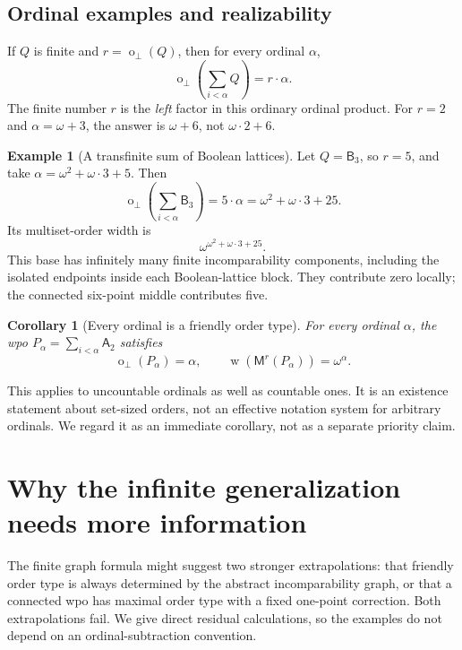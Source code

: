\documentclass[11pt,a4paper]{article}
\newtheorem{corollary}[theorem]{Corollary}
\theoremstyle{definition}
\newtheorem{example}[theorem]{Example}
\theoremstyle{remark}
\newcommand{\fot}{\operatorname{o}_{\perp}}
\newcommand{\wid}{\operatorname{w}}
\newcommand{\Mr}{\mathsf{M}^{r}}
\newcommand{\Ant}{\mathsf{A}}
\newcommand{\bool}{\mathsf{B}}
\begin{document}
\subsection{Ordinal examples and realizability}

If $Q$ is finite and $r=\fot(Q)$, then for every ordinal $\alpha$,
\begin{equation}\label{eq:repeat}
 \fot\!\left(\sum_{i<\alpha}Q\right)=r\cdot\alpha.
\end{equation}
The finite number $r$ is the \emph{left} factor in this ordinary ordinal
product. For $r=2$ and $\alpha=\omega+3$, the answer is $\omega+6$, not
$\omega\cdot2+6$.

\begin{example}[A transfinite sum of Boolean lattices]
Let $Q=\bool_3$, so $r=5$, and take
$\alpha=\omega^2+\omega\cdot3+5$. Then
\[
 \fot\!\left(\sum_{i<\alpha}\bool_3\right)
   =5\cdot\alpha=\omega^2+\omega\cdot3+25.
\]
Its multiset-order width is
\[
 \omega^{\omega^2+\omega\cdot3+25}.
\]
This base has infinitely many finite incomparability components, including
the isolated endpoints inside each Boolean-lattice block. They contribute
zero locally; the connected six-point middle contributes five.
\end{example}

\begin{corollary}[Every ordinal is a friendly order type]
For every ordinal $\alpha$, the wpo
$P_\alpha=\sum_{i<\alpha}\Ant_2$ satisfies
\[
 \fot(P_\alpha)=\alpha,\qquad
 \wid(\Mr(P_\alpha))=\omega^\alpha.
\]
\end{corollary}

This applies to uncountable ordinals as well as countable ones. It is an
existence statement about set-sized orders, not an effective notation system
for arbitrary ordinals. We regard it as an immediate corollary, not as a
separate priority claim.

\section{Why the infinite generalization needs more information}

The finite graph formula might suggest two stronger extrapolations: that
friendly order type is always determined by the abstract incomparability
graph, or that a connected wpo has maximal order type with a fixed one-point
correction. Both extrapolations fail. We give direct residual calculations,
so the examples do not depend on an ordinal-subtraction convention.
\end{document}
